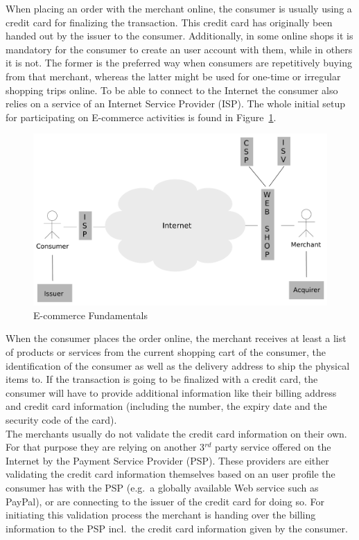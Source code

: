 When placing an order with the merchant online, the consumer is usually using a credit card for finalizing the transaction. This credit card has originally been handed out by the issuer to the consumer. Additionally, in some online shops it is mandatory for the consumer to create an user account with them, while in others it is not. The former is the preferred way when consumers are repetitively buying from that merchant, whereas the latter might be used for one-time or irregular shopping trips online. To be able to connect to the Internet the consumer also relies on a service of an Internet Service Provider (\gls{ISP}). The whole initial setup for participating on \gls{E-commerce} activities is found in Figure~\ref{fig:images_ecommerce_scenario}.\@

\begin{figure}[H]
	\centering
		\includegraphics[width=0.9\columnwidth]{images/e-commerce-scenario.pdf}
	\caption{\gls{E-commerce} Fundamentals}
\label{fig:images_ecommerce_scenario}
\end{figure}

When the consumer places the order online, the merchant receives at least a list of products or services from the current shopping cart of the consumer, the identification of the consumer as well as the delivery address to ship the physical items to. If the transaction is going to be finalized with a credit card, the consumer will have to provide additional information like their billing address and credit card information (including the number, the expiry date and the security code of the card). \\

The merchants usually do not validate the credit card information on their own. For that purpose they are relying on another 3$^{rd}$ party service offered on the Internet by the Payment Service Provider (\gls{PSP}). These providers are either validating the credit card information themselves based on an user profile the consumer has with the \gls{PSP} (e.g.\ a globally available Web service such as PayPal), or are connecting to the issuer of the credit card for doing so. For initiating this validation process the merchant is handing over the billing information to the \gls{PSP} incl.\ the credit card information given by the consumer. \\

